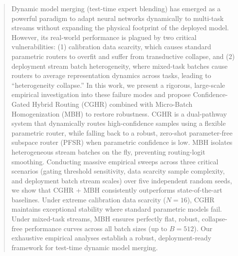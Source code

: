 \begin{abstract}
Dynamic model merging (test-time expert blending) has emerged as a powerful paradigm to adapt neural networks dynamically to multi-task streams without expanding the physical footprint of the deployed model. However, its real-world performance is plagued by two critical vulnerabilities: (1) calibration data scarcity, which causes standard parametric routers to overfit and suffer from transductive collapse, and (2) deployment stream batch heterogeneity, where mixed-task batches cause routers to average representation dynamics across tasks, leading to ``heterogeneity collapse.'' In this work, we present a rigorous, large-scale empirical investigation into these failure modes and propose Confidence-Gated Hybrid Routing (CGHR) combined with Micro-Batch Homogenization (MBH) to restore robustness. CGHR is a dual-pathway system that dynamically routes high-confidence samples using a flexible parametric router, while falling back to a robust, zero-shot parameter-free subspace router (PFSR) when parametric confidence is low. MBH isolates heterogeneous stream batches on the fly, preventing routing-logit smoothing. Conducting massive empirical sweeps across three critical scenarios (gating threshold sensitivity, data scarcity sample complexity, and deployment batch stream scales) over five independent random seeds, we show that CGHR + MBH consistently outperforms state-of-the-art baselines. Under extreme calibration data scarcity ($N=16$), CGHR maintains exceptional stability where standard parametric models fail. Under mixed-task streams, MBH ensures perfectly flat, robust, collapse-free performance curves across all batch sizes (up to $B=512$). Our exhaustive empirical analyses establish a robust, deployment-ready framework for test-time dynamic model merging.
\end{abstract}
